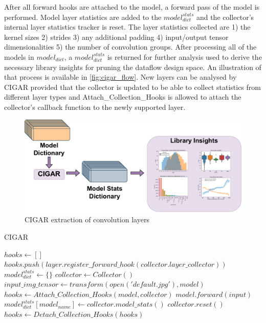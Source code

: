 After all forward hooks are attached to the model, a forward pass of the model
is performed. Model layer statistics are added to the $model^{stats}_{dict}$ and
the collector's internal layer statistics tracker is reset. The layer statistics
collected are 1) the kernel sizes 2) strides 3) any additional padding 4)
input/output tensor dimensionalities 5) the number of convolution groups. After
processing all of the models in $model_{dict}$, a $model^{stats}_{dict}$ is
returned for further analysis used to derive the necessary library insights for
pruning the dataflow design space. An illustration of that process is available
in \autoref{fig:cigar_flow}. New layers can be analysed by CIGAR provided that the
collector is updated to be able to collect statistics from different layer types
and Attach\_Collection\_Hooks is allowed to attach the collector's callback
function to the newly supported layer. 

\begin{figure}
    \centering
    \includegraphics[scale=0.4]{fig/Cigar_flow.pdf}
    \caption{\ac{CIGAR} extraction of convolution layers}
    \label{fig:cigar_flow}
\end{figure}

\begin{algorithm}[H] 
    \caption{\ac{CIGAR}}
    \label{alg:cigar_algo}
    \begin{algorithmic}[1]
    \Statex
        \State $hooks \gets []$
                \State $hooks.push(layer.register\_forward\_hook(collector.layer\_collector))$
            \EndIf 
        \EndFor
    \State {}    
    \EndFunction
    \Statex
        \State $model^{stats}_{dict} \gets \{\}$
        \State $collector \gets Collector()$
            \State $input\_img\_tensor \gets transform(open('default.jpg'), model)$
            \State $hooks \gets Attach\_Collection\_Hooks(model, collector)$
            \State $model.forward(input)$
            \State $model^{stats}_{dict}[model_{name}] \gets collector.model\_stats()$
            \State $collector.reset()$
            \State $hooks \gets Detach\_Collection\_Hooks(hooks)$
        \EndFor
        \State {}
    \EndFunction
    \end{algorithmic}
\end{algorithm}

